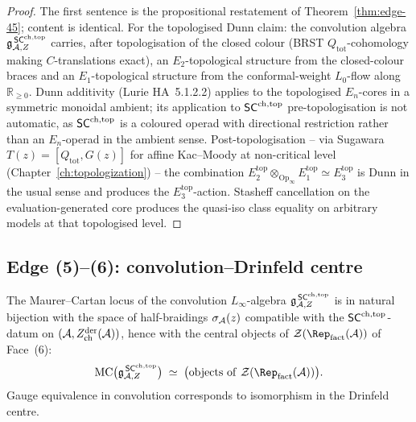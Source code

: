 \begin{proof}
The first sentence is the propositional restatement of
Theorem~\ref{thm:edge-45}; content is identical. For the topologised
Dunn claim: the convolution algebra $\mathfrak{g}^{\,\mathsf{SC}^{\mathrm{ch},\mathrm{top}}}_{\mathcal{A},Z}$
carries, after topologisation of the closed colour (BRST
$Q_{\mathrm{tot}}$-cohomology making $C$-translations exact), an
$E_2$-topological structure from the closed-colour braces and an
$E_1$-topological structure from the conformal-weight $L_0$-flow
along $\mathbb{R}_{\geq 0}$. Dunn additivity (Lurie HA~5.1.2.2) applies
to the topologised $E_n$-cores in a symmetric monoidal ambient; its
application to $\mathsf{SC}^{\mathrm{ch},\mathrm{top}}$ pre-topologisation is not automatic, as
$\mathsf{SC}^{\mathrm{ch},\mathrm{top}}$ is a coloured operad with directional restriction rather
than an $E_n$-operad in the ambient sense. Post-topologisation -- via
Sugawara $T(z)=[Q_{\mathrm{tot}},G(z)]$ for affine Kac--Moody at
non-critical level (Chapter~\ref{ch:topologization}) -- the
combination
$E_2^{\mathrm{top}}\otimes_{\mathrm{Op}_\infty}E_1^{\mathrm{top}}
\simeq E_3^{\mathrm{top}}$ is Dunn in the usual sense and produces the
$E_3^{\mathrm{top}}$-action. Stasheff cancellation on the
evaluation-generated core produces the quasi-iso class equality on
arbitrary models at that topologised level.
\end{proof}

\subsection{Edge (5)--(6): convolution--Drinfeld centre}\label{subsec:edge-56}

\begin{theorem}\label{thm:edge-56}%
The Maurer--Cartan locus of the convolution $L_\infty$-algebra
$\mathfrak{g}^{\,\mathsf{SC}^{\mathrm{ch},\mathrm{top}}}_{\mathcal{A},Z}$ is in natural bijection with the space of
half-braidings $\sigma_{\mathcal{A}}(z)$ compatible with the
$\mathsf{SC}^{\mathrm{ch},\mathrm{top}}$-datum on $(\mathcal{A},Z^{\mathrm{der}}_{\mathrm{ch}}(\mathcal{A}))$, hence
with the central objects of
$\cZ(\Rep_{\mathrm{fact}}(\cA))$ of Face~(6):
\begin{equation}
 \MC\bigl(\fg^{\,\SCchtop}_{\cA,Z}\bigr)
 \;\simeq\;
 \bigl(\mathrm{objects\ of\ }
 \cZ(\Rep_{\mathrm{fact}}(\cA))\bigr).
\end{equation}
Gauge equivalence in convolution corresponds to isomorphism in
the Drinfeld centre.
\end{theorem}


